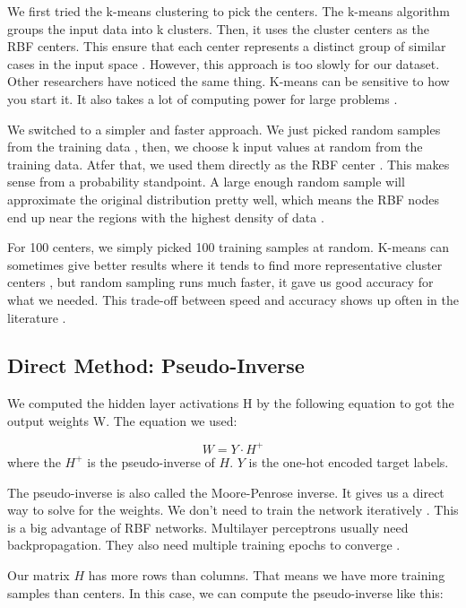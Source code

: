 \documentclass[12pt]{article}
\begin{document}
We first tried the k-means clustering to pick the centers. The k-means algorithm groups the input data into k clusters. Then, it uses the cluster centers as the RBF centers. This ensure that each center represents a distinct group of similar cases in the input space \cite{lim2022}. However, this approach is too slowly for our dataset. Other researchers have noticed the same thing. K-means can be sensitive to how you start it. It also takes a lot of computing power for large problems \cite{lim2022}.

We switched to a simpler and faster approach. We just picked random samples from the training data \cite{soper2023}, then, we choose k input values at random from the training data. Atfer that, we used them directly as the RBF center \cite{wang2010}. This makes sense from a probability standpoint. A large enough random sample will approximate the original distribution pretty well, which means the RBF nodes end up near the regions with the highest density of data \cite{soper2023}.

For 100 centers, we simply picked 100 training samples at random. K-means can sometimes give better results where it tends to find more representative cluster centers \cite{wang2010}, but random sampling runs much faster, it gave us good accuracy for what we needed. This trade-off between speed and accuracy shows up often in the literature \cite{soper2023}.

\subsection{Direct Method: Pseudo-Inverse}

We computed the hidden layer activations H by the following equation to got the output weights W. 
The equation we used:

\begin{equation}
	W = Y \cdot H^{+}
	\label{eq:direct}
\end{equation}
where the  $H^{+}$ is the pseudo-inverse of  $H$.
$Y$  is the one-hot encoded target labels.

The pseudo-inverse is also called the Moore-Penrose inverse. It gives us a direct way to
solve for the weights. We don’t need to train the network iteratively  \cite{broomhead1988}. This is a big advantage of RBF networks. Multilayer perceptrons usually need backpropagation. They also need multiple training epochs to converge \cite{haykin2009}.


Our matrix  $H$  has more rows than columns. That means we have more training samples
than centers. In this case, we can compute the pseudo-inverse like this:
\end{document}
